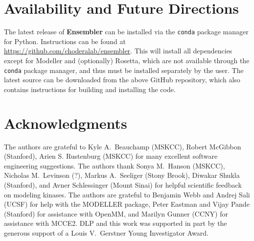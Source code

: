 \documentclass[aps,pre,twocolumn,nofootinbib,superscriptaddress,linenumbers]{revtex4-1}
\begin{document}
\section{Availability and Future Directions}
\label{section:availability}

The latest release of {\bf Ensembler} can be installed via the {\tt conda} package manager for Python.
Instructions can be found at \url{https://github.com/choderalab/ensembler}.
This will install all dependencies except for Modeller and (optionally) Rosetta, which are not available through the {\tt conda} package manager, and thus must be installed separately by the user.
The latest source can be downloaded from the above GitHub repository, which also contains instructions for building and installing the code.


\section{Acknowledgments}
\label{section:acknowledgments}

The authors are grateful to Kyle A.~Beauchamp (MSKCC), Robert McGibbon (Stanford), Arien S. Rustenburg (MSKCC) for many excellent software engineering suggestions.
The authors thank Sonya M.~Hanson (MSKCC), Nicholas M.~Levinson (?), Markus A.~Seeliger (Stony Brook), Diwakar Shukla (Stanford), and Avner Schlessinger (Mount Sinai) for helpful scientific feedback on modeling kinases.
The authors are grateful to Benjamin Webb and Andrej Sali (UCSF) for help with the MODELLER package, Peter Eastman and Vijay Pande (Stanford) for assistance with OpenMM, and Marilyn Gunner (CCNY) for assistance with MCCE2.
DLP and this work was supported in part by the generous support of a Louis V.~Gerstner Young Investigator Award.


% 

\end{document}
